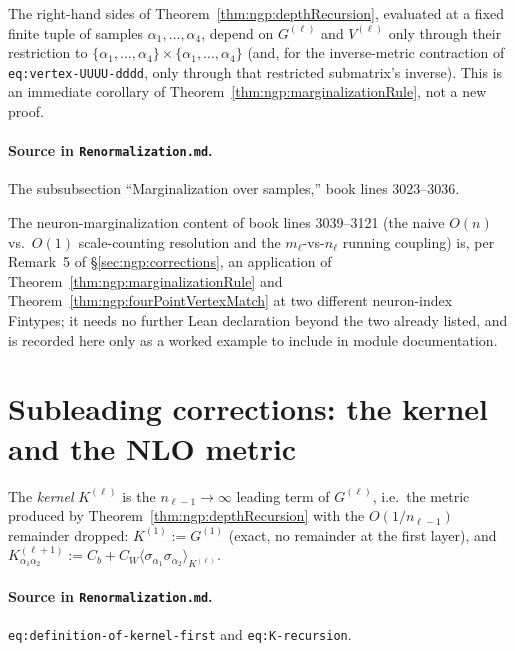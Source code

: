 \begin{corollary}
\label{cor:ngp:finiteSampleRecursion}
The right-hand sides of Theorem~\ref{thm:ngp:depthRecursion}, evaluated at a fixed finite tuple of
samples $\alpha_1,\ldots,\alpha_4$, depend on $G^{(\ell)}$ and $V^{(\ell)}$ only through their
restriction to $\{\alpha_1,\ldots,\alpha_4\}\times\{\alpha_1,\ldots,\alpha_4\}$ (and, for the
inverse-metric contraction of \texttt{eq:vertex-UUUU-dddd}, only through that restricted
submatrix's inverse). This is an immediate corollary of
Theorem~\ref{thm:ngp:marginalizationRule}, not a new proof.

\paragraph{Source in \texttt{Renormalization.md}.}
The subsubsection ``Marginalization over samples,'' book lines 3023--3036.
\end{corollary}

The neuron-marginalization content of book lines 3039--3121 (the naive $O(n)$ vs.\ $O(1)$
scale-counting resolution and the $m_\ell$-vs-$n_\ell$ running coupling) is, per
Remark~5 of \S\ref{sec:ngp:corrections}, an application of
Theorem~\ref{thm:ngp:marginalizationRule} and Theorem~\ref{thm:ngp:fourPointVertexMatch} at two
different neuron-index Fintypes; it needs no further Lean declaration beyond the two already
listed, and is recorded here only as a worked example to include in module documentation.

\section{Subleading corrections: the kernel and the NLO metric}
\label{sec:ngp:subleading}

\begin{definition}[Kernel]
\label{def:ngp:kernel}
The \emph{kernel} $K^{(\ell)}$ is the $n_{\ell-1}\to\infty$ leading term of $G^{(\ell)}$, i.e.\ the
metric produced by Theorem~\ref{thm:ngp:depthRecursion} with the $O(1/n_{\ell-1})$ remainder
dropped: $K^{(1)}:=G^{(1)}$ (exact, no remainder at the first layer), and
$K^{(\ell+1)}_{\alpha_1\alpha_2}:=C_b+C_W\langle\sigma_{\alpha_1}\sigma_{\alpha_2}\rangle_{K^{(\ell)}}$.

\paragraph{Source in \texttt{Renormalization.md}.}
\texttt{eq:definition-of-kernel-first} and \texttt{eq:K-recursion}.
\end{definition}

